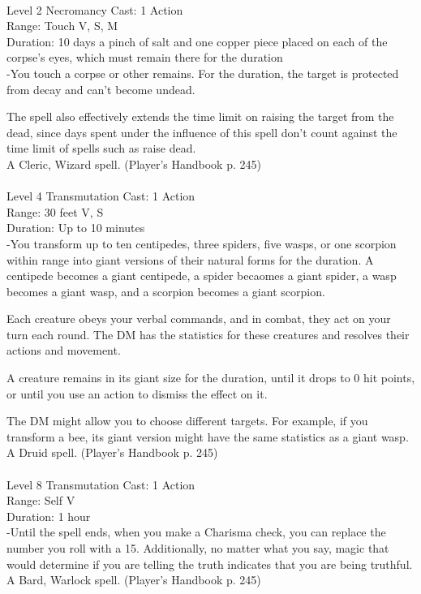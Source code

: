 \documentclass[10pt,twocolumn]{report}
\begin{document}
 \\
Level 2 \quad Necromancy \quad Cast: 1 Action\\
Range: Touch \quad V, S, M\\
Duration: 10 days \quad a pinch of salt and one copper piece placed on each of the corpse’s eyes, which must remain there for the duration\\
-You touch a corpse or other remains. For the duration, the target is protected from decay and can’t become undead.

The spell also effectively extends the time limit on raising the target from the dead, since days spent under the influence of this spell don’t count against the time limit of spells such as raise dead.\\
A Cleric, Wizard spell. (Player's Handbook p. 245) \\


 \\
Level 4 \quad Transmutation \quad Cast: 1 Action\\
Range: 30 feet \quad V, S\\
Duration: Up to 10 minutes \quad \\
-You transform up to ten centipedes, three spiders, five wasps, or one scorpion within range into giant versions of their natural forms for the duration. A centipede becomes a giant centipede, a spider becaomes a giant spider, a wasp becomes a giant wasp, and a scorpion becomes a giant scorpion.

Each creature obeys your verbal commands, and in combat, they act on your turn each round. The DM has the statistics for these creatures and resolves their actions and movement.

A creature remains in its giant size for the duration, until it drops to 0 hit points, or until you use an action to dismiss the effect on it.

The DM might allow you to choose different targets. For example, if you transform a bee, its giant version might have the same statistics as a giant wasp.\\
A Druid spell. (Player's Handbook p. 245) \\


 \\
Level 8 \quad Transmutation \quad Cast: 1 Action\\
Range: Self \quad V\\
Duration: 1 hour \quad \\
-Until the spell ends, when you make a Charisma check, you can replace the number you roll with a 15. Additionally, no matter what you say, magic that would determine if you are telling the truth indicates that you are being truthful.\\
A Bard, Warlock spell. (Player's Handbook p. 245) \\
\end{document}
